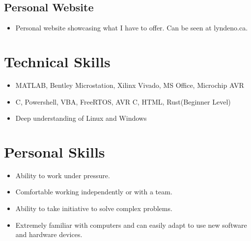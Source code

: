 \documentclass{lsanche_cv}
\begin{document}
\begin{multicols*}{2}
    \subsection{Personal Website}
      \begin{itemize}
        \item Personal website showcasing what I have to offer. Can be seen at lyndeno.ca.
      \end{itemize}
    
    \section{Technical Skills}
      \begin{itemize}
        \item MATLAB, Bentley Microstation, Xilinx Vivado, MS Office, Microchip AVR
        \item C, Powershell, VBA, FreeRTOS, AVR C, HTML, Rust(Beginner Level)
        \item Deep understanding of Linux and Windows
      \end{itemize}
    
    \section{Personal Skills}
      \begin{itemize}
        \item Ability to work under pressure.
        \item Comfortable working independently or with a team.
        \item Ability to take initiative to solve complex problems.
        \item Extremely familiar with computers and can easily adapt to use new software and hardware devices.
      \end{itemize}
\end{multicols*}
\end{document}

